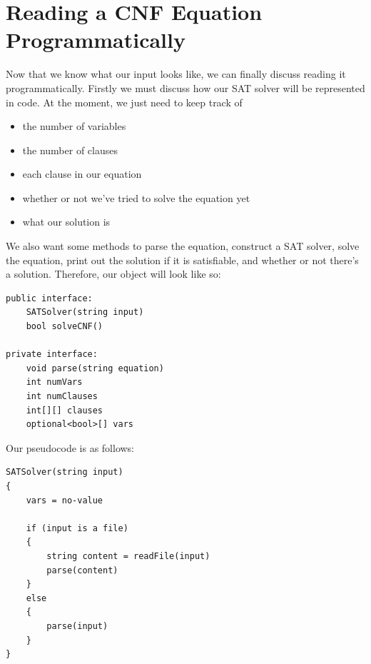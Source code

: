 \documentclass[oneside]{book}
\begin{document}
\section{Reading a CNF Equation Programmatically}

Now that we know what our input looks like, we can finally discuss reading it
programmatically. Firstly we must discuss how our SAT solver will be represented
in code. At the moment, we just need to keep track of

\begin{itemize}
    \item the number of variables
    \item the number of clauses
    \item each clause in our equation
    \item whether or not we've tried to solve the equation yet
    \item what our solution is
\end{itemize}

We also want some methods to parse the equation, construct a SAT solver,
solve the equation, print out the solution if it is satisfiable, and whether or not
there's a solution. Therefore, our object will look like so:

\begin{lstlisting}
public interface:
    SATSolver(string input)
    bool solveCNF()

private interface:
    void parse(string equation)
    int numVars
    int numClauses
    int[][] clauses
    optional<bool>[] vars
\end{lstlisting}

Our pseudocode is as follows:

\begin{lstlisting}
SATSolver(string input)
{
    vars = no-value

    if (input is a file)
    {
        string content = readFile(input)
        parse(content)
    }
    else
    {
        parse(input)
    }
}
\end{lstlisting}
\end{document}
